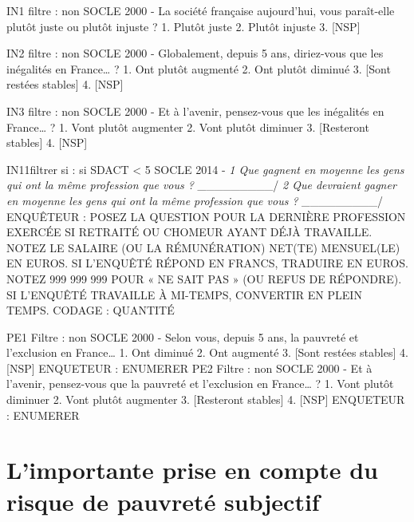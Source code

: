 \documentclass[12pt,a4paper]{reedthesis}
\begin{document}
IN1 filtre : non SOCLE 2000 -
La société française aujourd'hui, vous paraît-elle plutôt juste ou plutôt injuste ?
1. Plutôt juste
2. Plutôt injuste
3. {[}NSP{]}

IN2 filtre : non SOCLE 2000 -
Globalement, depuis 5 ans, diriez-vous que les inégalités en France\ldots{} ?
1. Ont plutôt augmenté
2. Ont plutôt diminué
3. {[}Sont restées stables{]}
4. {[}NSP{]}

IN3 filtre : non SOCLE 2000 -
Et à l'avenir, pensez-vous que les inégalités en France\ldots{} ?
1. Vont plutôt augmenter
2. Vont plutôt diminuer
3. {[}Resteront stables{]}
4. {[}NSP{]}

IN11filtrer si : si SDACT \textless{} 5 SOCLE 2014 -
\emph{1 Que gagnent en moyenne les gens qui ont la même profession que vous ?
\_}\_\_\_\_\_\_\_\_/
\emph{2 Que devraient gagner en moyenne les gens qui ont la même profession que vous ?
\_}\_\_\_\_\_\_\_\_/
ENQUÊTEUR : POSEZ LA QUESTION POUR LA DERNIÈRE PROFESSION EXERCÉE SI RETRAITÉ OU CHOMEUR AYANT DÉJÀ TRAVAILLE. NOTEZ LE SALAIRE (OU LA RÉMUNÉRATION) NET(TE) MENSUEL(LE) EN EUROS. SI L'ENQUÊTÉ RÉPOND EN FRANCS, TRADUIRE EN EUROS. NOTEZ 999 999 999 POUR « NE SAIT PAS » (OU REFUS DE RÉPONDRE). SI L'ENQUÊTÉ TRAVAILLE À MI-TEMPS, CONVERTIR EN PLEIN TEMPS.
CODAGE : QUANTITÉ

PE1 Filtre : non SOCLE 2000 -
Selon vous, depuis 5 ans, la pauvreté et l'exclusion en France\ldots{}
1. Ont diminué
2. Ont augmenté
3. {[}Sont restées stables{]}
4. {[}NSP{]}
ENQUETEUR : ENUMERER
PE2 Filtre : non SOCLE 2000 -
Et à l'avenir, pensez-vous que la pauvreté et l'exclusion en France\ldots{} ?
1. Vont plutôt diminuer
2. Vont plutôt augmenter
3. {[}Resteront stables{]}
4. {[}NSP{]}
ENQUETEUR : ENUMERER

\hypertarget{limportante-prise-en-compte-du-risque-de-pauvretuxe9-subjectif}{%
\section{L'importante prise en compte du risque de pauvreté subjectif}\label{limportante-prise-en-compte-du-risque-de-pauvretuxe9-subjectif}}
\end{document}
